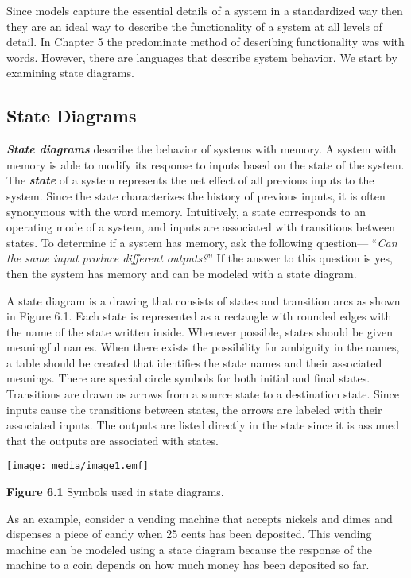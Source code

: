 Since models capture the essential details of a system in a standardized
way then they are an ideal way to describe the functionality of a system
at all levels of detail. In Chapter 5 the predominate method of
describing functionality was with words. However, there are languages
that describe system behavior. We start by examining state diagrams.

\subsection{State Diagrams}\label{state-diagrams}

\emph{\textbf{State diagrams}} describe the behavior of systems with
memory. A system with memory is able to modify its response to inputs
based on the state of the system. The \emph{\textbf{state}} of a system
represents the net effect of all previous inputs to the system. Since
the state characterizes the history of previous inputs, it is often
synonymous with the word memory. Intuitively, a state corresponds to an
operating mode of a system, and inputs are associated with transitions
between states. To determine if a system has memory, ask the following
question--- ``\emph{Can the same input produce different outputs?}'' If
the answer to this question is yes, then the system has memory and can
be modeled with a state diagram.

A state diagram is a drawing that consists of states and transition arcs
as shown in Figure 6.1. Each state is represented as a rectangle with
rounded edges with the name of the state written inside. Whenever
possible, states should be given meaningful names. When there exists the
possibility for ambiguity in the names, a table should be created that
identifies the state names and their associated meanings. There are
special circle symbols for both initial and final states. Transitions
are drawn as arrows from a source state to a destination state. Since
inputs cause the transitions between states, the arrows are labeled with
their associated inputs. The outputs are listed directly in the state
since it is assumed that the outputs are associated with states.

\texttt{[image: media/image1.emf]}

\textbf{Figure 6.1} Symbols used in state diagrams.

As an example, consider a vending machine that accepts nickels and dimes
and dispenses a piece of candy when 25 cents has been deposited. This
vending machine can be modeled using a state diagram because the
response of the machine to a coin depends on how much money has been
deposited so far.

